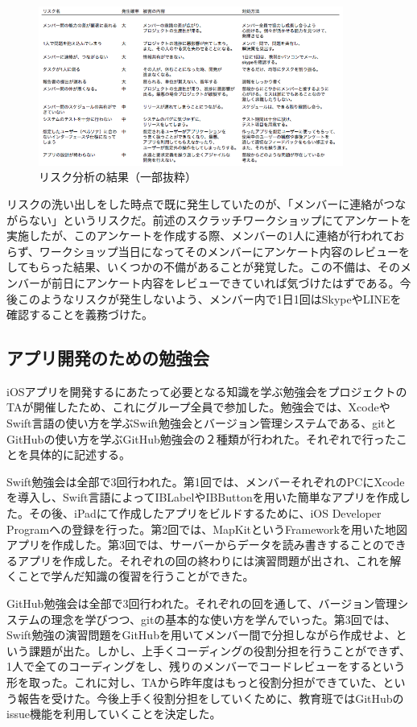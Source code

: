 \documentclass[openany,11pt,papersize]{jsbook}
\begin{document}
\begin{figure}[H]
\begin{center}
\includegraphics[width=10cm, bb=0 0 753 394]{img/RiskManagement.png}
\end{center}
\caption{リスク分析の結果（一部抜粋）}
\end{figure}

\par リスクの洗い出しをした時点で既に発生していたのが、「メンバーに連絡がつながらない」というリスクだ。前述のスクラッチワークショップにてアンケートを実施したが、このアンケートを作成する際、メンバーの1人に連絡が行われておらず、ワークショップ当日になってそのメンバーにアンケート内容のレビューをしてもらった結果、いくつかの不備があることが発覚した。この不備は、そのメンバーが前日にアンケート内容をレビューできていれば気づけたはずである。今後このようなリスクが発生しないよう、メンバー内で1日1回はSkypeやLINEを確認することを義務づけた。

\subsection{アプリ開発のための勉強会}
\par iOSアプリを開発するにあたって必要となる知識を学ぶ勉強会をプロジェクトのTAが開催したため、これにグループ全員で参加した。勉強会では、XcodeやSwift言語の使い方を学ぶSwift勉強会とバージョン管理システムである、gitとGitHubの使い方を学ぶGitHub勉強会の２種類が行われた。それぞれで行ったことを具体的に記述する。
\par Swift勉強会は全部で3回行われた。第1回では、メンバーそれぞれのPCにXcodeを導入し、Swift言語によってIBLabelやIBButtonを用いた簡単なアプリを作成した。その後、iPadにて作成したアプリをビルドするために、iOS Developer Programへの登録を行った。第2回では、MapKitというFrameworkを用いた地図アプリを作成した。第3回では、サーバーからデータを読み書きすることのできるアプリを作成した。それぞれの回の終わりには演習問題が出され、これを解くことで学んだ知識の復習を行うことができた。
\par GitHub勉強会は全部で3回行われた。それぞれの回を通して、バージョン管理システムの理念を学びつつ、gitの基本的な使い方を学んでいった。第3回では、Swift勉強の演習問題をGitHubを用いてメンバー間で分担しながら作成せよ、という課題が出た。しかし、上手くコーディングの役割分担を行うことができず、1人で全てのコーディングをし、残りのメンバーでコードレビューをするという形を取った。これに対し、TAから昨年度はもっと役割分担ができていた、という報告を受けた。今後上手く役割分担をしていくために、教育班ではGitHubのissue機能を利用していくことを決定した。
\end{document}

